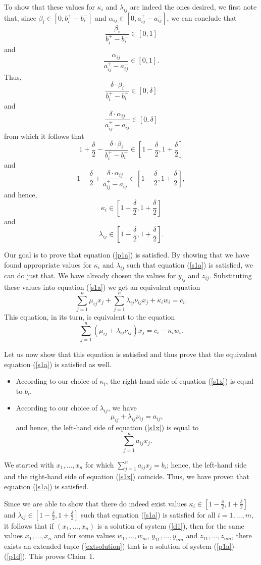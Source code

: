 To show that these values for $\kappa_i$ and $\lambda_{ij}$ are indeed the
ones desired, we first note that, since $\beta_i\in[0,b_i^+-b_i^-]$ and
$\alpha_{ij}\in[0,a_{ij}^+-a_{ij}^-]$, we can conclude that
$$
  \frac{\beta_i}{b_i^+-b_i^-}\in[0,1]
$$
and
$$
  \frac{\alpha_{ij}}{a_{ij}^+-a_{ij}^-}\in[0,1].
$$
Thus,
$$
  \frac{\delta\cdot\beta_i}{b_i^+-b_i^-}\in[0,\delta]
$$
and
$$
  \frac{\delta\cdot\alpha_{ij}}{a_{ij}^+-a_{ij}^-}\in[0,\delta]
$$
from which it follows that
$$
  1+\frac{\delta}{2}-\frac{\delta\cdot\beta_i}{b_i^+-b_i^-}
   \in[1-\frac{\delta}{2},1+\frac{\delta}{2}]
$$
and
$$
  1-\frac{\delta}{2}+\frac{\delta\cdot\alpha_{ij}}{a_{ij}^+-a_{ij}^-}
   \in[1-\frac{\delta}{2},1+\frac{\delta}{2}],
$$
and hence,
$$
  \kappa_i\in[1-\frac{\delta}{2},1+\frac{\delta}{2}]
$$
and
$$
  \lambda_{ij}\in[1-\frac{\delta}{2},1+\frac{\delta}{2}].
$$

Our goal is to prove that equation (\ref{p1a}) is satisfied.  By showing that
we have found appropriate values for $\kappa_i$ and $\lambda_{ij}$ such that
equation (\ref{s1a}) is satisfied, we can do just that.  We have already
chosen the values for $y_{ij}$ and $z_{ij}$.  Substituting these values into
equation (\ref{s1a}) we get an equivalent equation
$$
  \sum_{j=1}^n \mu_{ij} x_j + \sum_{j=1}^n \lambda_{ij} \nu_{ij} x_j +
   \kappa_i w_i = c_i.
$$
This equation, in its turn, is equivalent to the equation
\begin{equation}
  \sum_{j=1}^n(\mu_{ij}+\lambda_{ij}\nu_{ij})x_j=c_i-\kappa_i w_i. \label{s1x}
\end{equation}

Let us now show that this equation is satisfied and thus prove that the
equivalent equation (\ref{s1a}) is satisfied as well.
\begin{itemize}
\item According to our choice of $\kappa_i$, the right-hand side of equation
  (\ref{s1x}) is equal to $b_i$.
\item According to our choice of $\lambda_{ij}$, we have
  $$
    \mu_{ij}+\lambda_{ij}\nu_{ij}=a_{ij},
  $$
  and hence, the left-hand side of equation (\ref{s1x}) is equal to
  $$
    \sum_{j=1}^n a_{ij}x_j.
  $$
\end{itemize}
We started with $x_1,\ldots,x_n$ for which ${\displaystyle\sum_{j=1}^n a_{ij}
x_j=b_i}$; hence, the left-hand side and the right-hand side of equation
(\ref{s1x}) coincide.  Thus, we have proven that equation (\ref{s1a}) is
satisfied.

Since we are able to show that there do indeed exist values
${\displaystyle\kappa_i\in[1-\frac{\delta}{2},1+\frac{\delta}{2}]}$ and
${\displaystyle\lambda_{ij}\in[1-\frac{\delta}{2},1+\frac{\delta}{2}]}$ such
that equation (\ref{s1a}) is satisfied for all $i=1,\ldots,m$, it follows that
if $(x_1,\ldots,x_n)$ is a solution of system (\ref{d1}), then for the same
values $x_1,\ldots,x_n$ and for some values $w_1,\ldots,w_m$,
$y_{11},\ldots,y_{mn}$ and $z_{11},\ldots,z_{mn}$, there exists an extended
tuple (\ref{extsolution}) that is a solution of system
(\ref{p1a})--(\ref{p1d}).  This proves Claim~1.

